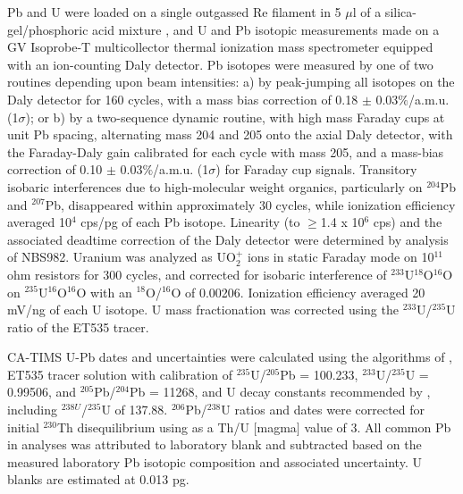 \documentclass[11pt,letterpaper]{article}
\begin{document}
Pb and U were loaded on a single outgassed Re filament in 5 $\mu$l of a silica-gel/phosphoric acid mixture \citep{Gerstenberger1997a}, and U and Pb isotopic measurements made on a GV Isoprobe-T multicollector thermal ionization mass spectrometer equipped with an ion-counting Daly detector. Pb isotopes were measured by one of two routines depending upon beam intensities: a) by peak-jumping all isotopes on the Daly detector for 160 cycles, with a mass bias correction of 0.18 $\pm$ 0.03$\%$/a.m.u. (1$\sigma$); or b) by a two-sequence dynamic routine, with high mass Faraday cups at unit Pb spacing, alternating mass 204 and 205 onto the axial Daly detector, with the Faraday-Daly gain calibrated for each cycle with mass 205, and a mass-bias correction of 0.10 $\pm$ 0.03$\%$/a.m.u. (1$\sigma$) for Faraday cup signals. Transitory isobaric interferences due to high-molecular weight organics, particularly on $^{204}$Pb and $^{207}$Pb, disappeared within approximately 30 cycles, while ionization efficiency averaged 10$^4$ cps/pg of each Pb isotope. Linearity (to $\geq$1.4 x 10$^6$ cps) and the associated deadtime correction of the Daly detector were determined by analysis of NBS982. Uranium was analyzed as UO$_2^+$ ions in static Faraday mode on 10$^{11}$ ohm resistors for 300 cycles, and corrected for isobaric interference of $^{233}$U$^{18}$O$^{16}$O on $^{235}$U$^{16}$O$^{16}$O with an $^{18}$O/$^{16}$O of 0.00206. Ionization efficiency averaged 20 mV/ng of each U isotope. U mass fractionation was corrected using the $^{233}$U/$^{235}$U ratio of the ET535 tracer.

CA-TIMS U-Pb dates and uncertainties were calculated using the algorithms of \cite{Schmitz2007b}, ET535 tracer solution \citep{Condon2015a} with calibration of $^{235}$U/$^{205}$Pb = 100.233, $^{233}$U/$^{235}$U = 0.99506, and $^{205}$Pb/$^{204}$Pb = 11268, and U decay constants recommended by \cite{Jaffey1971a}, including $^{238U}$/$^{235}$U of 137.88. $^{206}$Pb/$^{238}$U ratios and dates were corrected for initial $^{230}$Th disequilibrium using as a Th/U $[$magma$]$ value of 3. All common Pb in analyses was attributed to laboratory blank and subtracted based on the measured laboratory Pb isotopic composition and associated uncertainty. U blanks are estimated at 0.013 pg.


\end{document}

